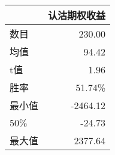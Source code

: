 \begin{tabular}{lr}
\toprule
{} &   认沽期权收益 \\
\midrule
数目 &   230.00 \\
均值  &    94.42 \\
t值   &   1.96 \\
胜率 & 51.74\%   \\
最小值   & -2464.12 \\
50\%   &   -24.73 \\
最大值   &  2377.64 \\
\bottomrule
\end{tabular}
